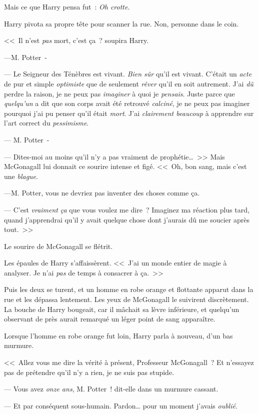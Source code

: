 Mais ce que Harry pensa fut~: \emph{Oh crotte}.

Harry pivota sa propre tête pour scanner la rue. Non, personne dans le coin.

<<~Il n'est \emph{pas} mort, c'est ça~? soupira Harry.

---M. Potter~-

--- Le Seigneur des Ténèbres est vivant. \emph{Bien sûr} qu'il est vivant. C'était un \emph{acte} de pur et simple \emph{optimiste} que de seulement \emph{rêver} qu'il en soit autrement. J'ai \emph{dû} perdre la raison, je ne peux pas \emph{imaginer} à quoi je \emph{pensais}. Juste parce que \emph{quelqu'un} a dit que son corps avait été retrouvé \emph{calciné}, je ne peux pas imaginer pourquoi j'ai pu penser qu'il était \emph{mort}. J'ai \emph{clairement beaucoup} à apprendre sur l'art correct du \emph{pessimisme}.

--- M. Potter~-

--- Dites-moi au moins qu'il n'y a pas vraiment de prophétie…~>> Mais McGonagall lui donnait ce sourire intense et figé. <<~Oh, bon sang, mais c'est une \emph{blague}.

---M. Potter, vous ne devriez pas inventer des choses comme ça.

--- C'est \emph{vraiment} \emph{ça} que vous voulez me dire~? Imaginez ma réaction plus tard, quand j'apprendrai qu'il y avait quelque chose dont j'aurais dû me soucier après tout.~>>

Le sourire de McGonagall se flétrit.

Les épaules de Harry s'affaissèrent. <<~J'ai un monde entier de magie à analyser. Je n'ai \emph{pas} de temps à consacrer à ça.~>>

Puis les deux se turent, et un homme en robe orange et flottante apparut dans la rue et les dépassa lentement. Les yeux de McGonagall le suivirent discrètement. La bouche de Harry bougeait, car il mâchait sa lèvre inférieure, et quelqu'un observant de près aurait remarqué un léger point de sang apparaître.

Lorsque l'homme en robe orange fut loin, Harry parla à nouveau, d'un bas murmure.

<<~Allez vous me dire la vérité à présent, Professeur McGonagall~? Et n'essayez pas de prétendre qu'il n'y a rien, je ne suis pas stupide.

--- Vous avez \emph{onze ans}, M. Potter~! dit-elle dans un murmure cassant.

--- Et par conséquent sous-humain. Pardon… pour un moment j'avais \emph{oublié}.

